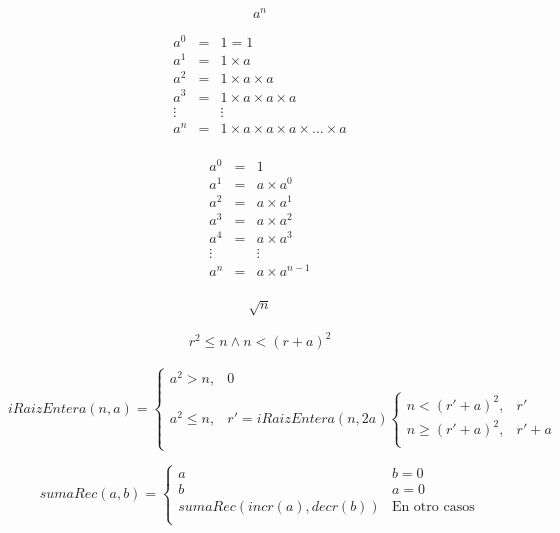 \documentclass[12pt,letterpaper]{article}
\begin{document}
\[
  a^n
\]

\begin{eqnarray*}
  a^0 & = & 1 = 1 \\
  a^1 & = & 1 \times a \\
  a^2 & = & 1 \times a \times a\\
  a^3 & = & 1 \times a \times a \times a \\
  \vdots & & \vdots \\
  a^n & = & 1 \times a \times a \times a \times \ldots \times a \\
\end{eqnarray*}

\begin{eqnarray*}
  a^0 & = & 1  \\
  a^1 & = & a \times a^0   \\
  a^2 & = & a \times a^1  \\
  a^3 & = & a \times a^2 \\
  a^4 & = & a \times a^3 \\
  \vdots & & \vdots \\
  a^n & = & a \times a^{n-1} \\
\end{eqnarray*}


\[
  \sqrt{n}
\]

\begin{eqnarray*}
  r^2 \leq n \wedge n < (r + a)^2
\end{eqnarray*}


\[
  iRaizEntera(n,a) =
  \begin{cases}
    a^2 > n, & 0 \\
    a^2 \leq n, & r' = iRaizEntera(n,2a)
    \begin{cases}
      n < (r' + a)^2, & r' \\
      n \geq (r' + a)^2, & r' + a \\
    \end{cases}
  \end{cases}
\]


\[
  sumaRec(a,b) = 
  \begin{cases}
    a & b = 0\\
    b & a = 0\\
    sumaRec(incr(a),decr(b)) & \text{En otro casos} \\
  \end{cases}
\]

\end{document}
